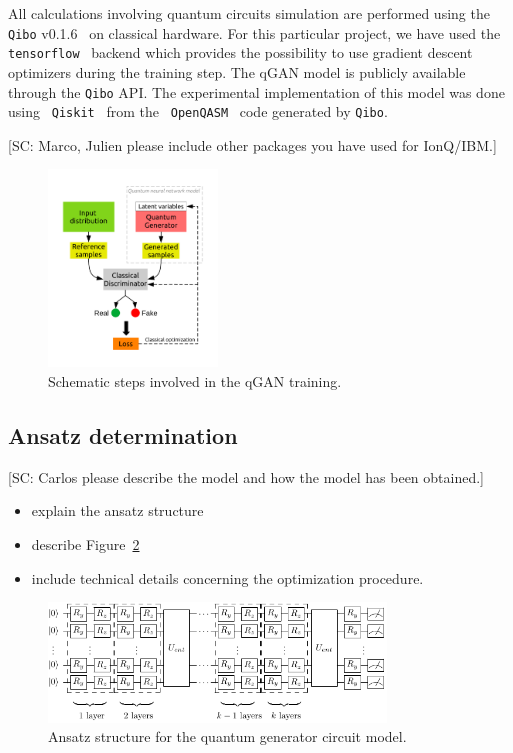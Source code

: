 \documentclass[twocolumn,preprintnumbers,superscriptaddress]{revtex4-2}
\begin{document}
All calculations involving quantum circuits simulation are performed using the
{\tt Qibo} v0.1.6~\cite{efthymiou2020qibo,stavros_efthymiou_2021_5088103} on
classical hardware. For this particular project, we have used the {\tt
tensorflow}~\cite{tensorflow2015-whitepaper} backend which provides the
possibility to use gradient descent optimizers during the training step. The
qGAN model is publicly available through the {\tt Qibo} API. The experimental
implementation of this model was done using {\tt
Qiskit}~\cite{gadi_aleksandrowicz_2019_2562111} from the {\tt
OpenQASM}~\cite{cross2017open} code generated by {\tt Qibo}.

{\color{red}[SC: Marco, Julien please include other packages you have used for IonQ/IBM.]}

\begin{figure}
  \includegraphics[width=0.4\textwidth]{plots/scheme.pdf}
  \caption{\label{fig:scheme} Schematic steps involved in the qGAN training.}
\end{figure}

\subsection{Ansatz determination}

{\color{red}[SC: Carlos please describe the model and how the model has been
    obtained.]}

\begin{itemize}
  \item explain the ansatz structure
  \item describe Figure~\ref{fig:circuit}
  \item include technical details concerning the optimization procedure.
\end{itemize}

\begin{figure}
  \includegraphics[width=0.8\textwidth]{plots/ansatz1.pdf}
  \caption{\label{fig:circuit}Ansatz structure for the quantum generator circuit model.}
\end{figure}
\end{document}
